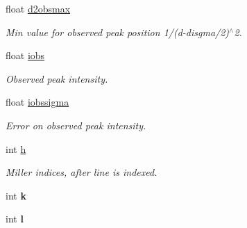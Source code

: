 \begin{DoxyCompactItemize}
float \mbox{\hyperlink{struct_obj_cryst_1_1_peak_list_1_1hkl_a437e9b76b38092c298b4f4aa64b45a9e}{d2obsmax}}
\begin{DoxyCompactList}\small\item\em Min value for observed peak position 1/(d-\/disgma/2)$^\wedge$2. \end{DoxyCompactList}\item 
\mbox{\label{struct_obj_cryst_1_1_peak_list_1_1hkl_a84f98b9cf3b479c563d49dbb87e42700}} 
float \mbox{\hyperlink{struct_obj_cryst_1_1_peak_list_1_1hkl_a84f98b9cf3b479c563d49dbb87e42700}{iobs}}
\begin{DoxyCompactList}\small\item\em Observed peak intensity. \end{DoxyCompactList}\item 
\mbox{\label{struct_obj_cryst_1_1_peak_list_1_1hkl_aec948131b33d0f5a1c898119d131e0d8}} 
float \mbox{\hyperlink{struct_obj_cryst_1_1_peak_list_1_1hkl_aec948131b33d0f5a1c898119d131e0d8}{iobssigma}}
\begin{DoxyCompactList}\small\item\em Error on observed peak intensity. \end{DoxyCompactList}\item 
\mbox{\label{struct_obj_cryst_1_1_peak_list_1_1hkl_ac0ab3e1d9bacbeb86c581adc48b61d51}} 
int \mbox{\hyperlink{struct_obj_cryst_1_1_peak_list_1_1hkl_ac0ab3e1d9bacbeb86c581adc48b61d51}{h}}
\begin{DoxyCompactList}\small\item\em Miller indices, after line is indexed. \end{DoxyCompactList}\item 
\mbox{\label{struct_obj_cryst_1_1_peak_list_1_1hkl_a2833fb7b4399c1bb5b4c18cdde593bc8}} 
int {\bfseries k}
\item 
\mbox{\label{struct_obj_cryst_1_1_peak_list_1_1hkl_abcbb5600968e6e6ba8cf3249ea347b1f}} 
int {\bfseries l}
\item 
\mbox{\label{struct_obj_cryst_1_1_peak_list_1_1hkl_aac462f11d462e446b70a008118ee979a}} 

\end{DoxyCompactItemize}
